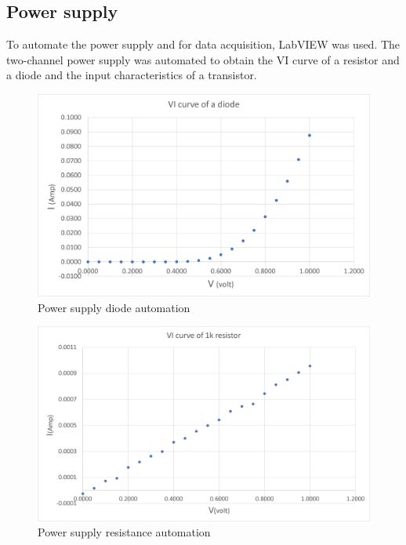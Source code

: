 \documentclass[12pt,a4paper,bold]{thesis}
\theoremstyle{thm}
\theoremstyle{definition}
\begin{document}
\subsection{Power supply} 
To automate the power supply and for data acquisition, LabVIEW was used. The two-channel power supply was automated to obtain the VI curve of a resistor and a diode and the input characteristics of a transistor.
\begin{figure}[H]
	\centering
   \includegraphics[scale=0.56]{Images/46.png} 
   \caption{Power supply diode automation}
\end{figure}
\begin{figure}[H]
	\centering
   \includegraphics[scale=0.56]{Images/47.png} 
   \caption{Power supply resistance automation}
\end{figure}
\end{document}
